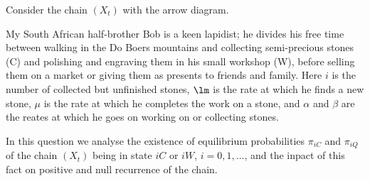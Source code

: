 \begin{exercise}
Consider the chain $(X_t)$ with the arrow diagram.

My South African half-brother Bob is a keen lapidist; he divides his free time between walking in the Do Boers mountains and collecting semi-precious stones (C) and polishing and engraving them in his small workshop (W), before selling them on a market or giving them as presents to friends and family. Here $i$ is the number of collected but unfinished stones, $\lm$ is the rate at which he finds a new stone, $\mu$ is the rate at which he completes the
work on a stone, and $\alpha$ and $\beta$ are the reates at which he goes on working on or collecting stones.

In this question we analyse the existence of equilibrium probabilities $\pi_{iC}$ and $\pi_{iQ}$ of the chain $(X_t)$ being in state $iC$ or $iW$, $i = 0, 1,\dots$, and the inpact of this fact on positive and null recurrence of the chain.

\end{exercise}
